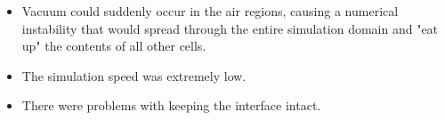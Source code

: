 

\begin{itemize}
    \item Vacuum could suddenly occur in the air regions, causing a numerical instability that would spread through the entire simulation domain and "eat up" the contents of all other cells.
    
    
    \item The simulation speed was extremely low. %
    
    \item There were problems with keeping the interface intact. %
    

\end{itemize}
